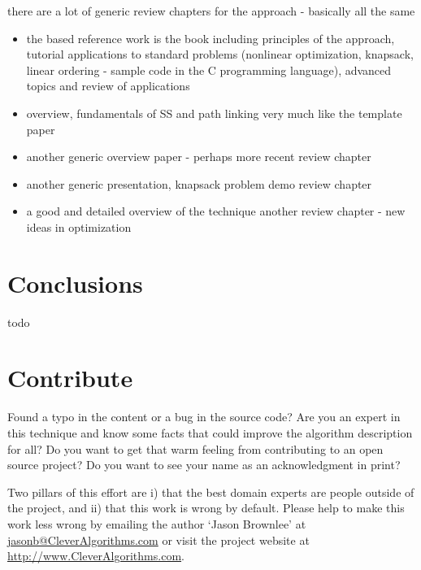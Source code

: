 \documentclass[a4paper, 11pt]{article}
\makeatletter
\newcommand{\myreportauthor}{Jason Brownlee}
\newcommand{\myreportemail}{jasonb@CleverAlgorithms.com}
\newcommand{\myreportwebsite}{http://www.CleverAlgorithms.com}
\makeatother
\begin{document}
there are a lot of generic review chapters for the approach - basically all the same

\begin{itemize}
	\item the based reference work is the book \cite{Laguna2003} including principles of the approach, tutorial applications to standard problems (nonlinear optimization, knapsack, linear ordering - sample code in the C programming language), advanced topics and review of applications
	\item overview, fundamentals of SS and path linking \cite{Glover2000} very much like the template paper
	\item another generic overview paper - perhaps more recent \cite{Martia2006} review chapter
	\item another generic presentation, knapsack problem demo \cite{Laguna2002} review chapter
	\item a good and detailed overview of the technique \cite{Glover1999} another review chapter - new ideas in optimization
\end{itemize}


% 
% 
\section{Conclusions}
\label{sec:conclusions}
todo

% 
% 
\section{Contribute}
\label{sec:contribute}
Found a typo in the content or a bug in the source code? 
Are you an expert in this technique and know some facts that could improve the algorithm description for all?
Do you want to get that warm feeling from contributing to an open source project? 
Do you want to see your name as an acknowledgment in print?

Two pillars of this effort are i) that the best domain experts are people outside of the project, and ii) that this work is wrong by default. 
Please help to make this work less wrong by emailing the author `\myreportauthor' at \url{\myreportemail} or visit the project website at \url{\myreportwebsite}.



\end{document}
